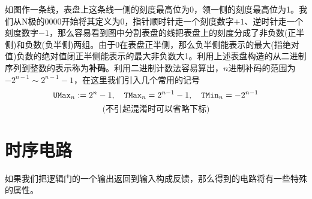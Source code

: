 如图作一条线，表盘上这条线一侧的刻度最高位为0，领一侧的刻度最高位为1。我们从N极的0000开始将其定义为0，指针顺时针走一个刻度数字$+1$、逆时针走一个刻度数字$-1$，那么容易看到图中分割表盘的线把表盘上的刻度分成了非负数(正半侧)和负数(负半侧)两组。由于0在表盘正半侧，那么负半侧能表示的最大(指绝对值)负数的绝对值闭正半侧能表示的最大非负数大1。利用上述表盘构造的从二进制序列到整数的表示称为\textbf{补码}。利用二进制计数法容易算出\textsuperscript{\cite{CSAPP}}，$n$进制补码的范围为$-2^{n-1}\sim 2^{n-1}-1$，在这里我们引入几个常用的记号
$$\operatorname{\texttt{UMax}}_n:=2^n-1,\quad \operatorname{\texttt{TMax}}_n=2^{n-1}-1,\quad \operatorname{\texttt{TMin}}_n=-2^{n-1}$$
$$\text{(不引起混淆时可以省略下标)}$$

\section*{时序电路}
\par 如果我们把逻辑门的一个输出返回到输入构成反馈，那么得到的电路将有一些特殊的属性。